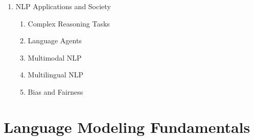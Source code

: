 \documentclass[a4paper]{article}
\begin{document}
\begin{enumerate}
  \item NLP Applications and Society
  \begin{enumerate}
    \item Complex Reasoning Tasks
    \item Language Agents
    \item Multimodal NLP
    \item Multilingual NLP
    \item Bias and Fairness
  \end{enumerate}
\end{enumerate}

\section{Language Modeling Fundamentals}
\end{document}
